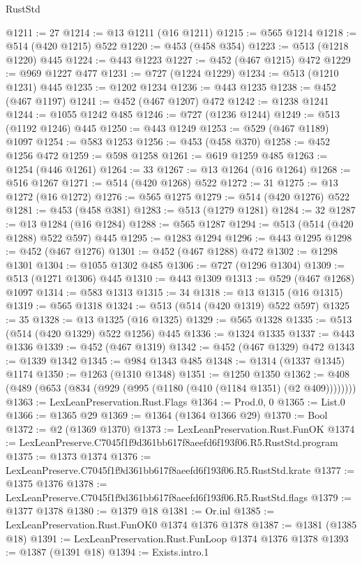 \begin{lexlean}{RustStd}
\begin{coremodule}
@1211 := 27
@1214 := @13 @1211 (@16 @1211)
@1215 := @565 @1214
@1218 := @514 (@420 @1215) @522
@1220 := @453 (@458 @354)
@1223 := @513 (@1218 @1220) @445
@1224 := @443 @1223
@1227 := @452 (@467 @1215) @472
@1229 := @969 @1227 @477
@1231 := @727 (@1224 @1229)
@1234 := @513 (@1210 @1231) @445
@1235 := @1202 @1234
@1236 := @443 @1235
@1238 := @452 (@467 @1197)
@1241 := @452 (@467 @1207) @472
@1242 := @1238 @1241
@1244 := @1055 @1242 @485
@1246 := @727 (@1236 @1244)
@1249 := @513 (@1192 @1246) @445
@1250 := @443 @1249
@1253 := @529 (@467 @1189) @1097
@1254 := @583 @1253
@1256 := @453 (@458 @370)
@1258 := @452 @1256 @472
@1259 := @598 @1258
@1261 := @619 @1259 @485
@1263 := @1254 (@446 @1261)
@1264 := 33
@1267 := @13 @1264 (@16 @1264)
@1268 := @516 @1267
@1271 := @514 (@420 @1268) @522
@1272 := 31
@1275 := @13 @1272 (@16 @1272)
@1276 := @565 @1275
@1279 := @514 (@420 @1276) @522
@1281 := @453 (@458 @381)
@1283 := @513 (@1279 @1281)
@1284 := 32
@1287 := @13 @1284 (@16 @1284)
@1288 := @565 @1287
@1294 := @513 (@514 (@420 @1288) @522 @597) @445
@1295 := @1283 @1294
@1296 := @443 @1295
@1298 := @452 (@467 @1276)
@1301 := @452 (@467 @1288) @472
@1302 := @1298 @1301
@1304 := @1055 @1302 @485
@1306 := @727 (@1296 @1304)
@1309 := @513 (@1271 @1306) @445
@1310 := @443 @1309
@1313 := @529 (@467 @1268) @1097
@1314 := @583 @1313
@1315 := 34
@1318 := @13 @1315 (@16 @1315)
@1319 := @565 @1318
@1324 := @513 (@514 (@420 @1319) @522 @597)
@1325 := 35
@1328 := @13 @1325 (@16 @1325)
@1329 := @565 @1328
@1335 := @513 (@514 (@420 @1329) @522 @1256) @445
@1336 := @1324 @1335
@1337 := @443 @1336
@1339 := @452 (@467 @1319)
@1342 := @452 (@467 @1329) @472
@1343 := @1339 @1342
@1345 := @984 @1343 @485
@1348 := @1314 (@1337 @1345) @1174
@1350 := @1263 (@1310 @1348)
@1351 := @1250 @1350
@1362 := @408 (@489 (@653 (@834 (@929 (@995 (@1180 (@410 (@1184 @1351) (@2 @409))))))))
@1363 := LexLeanPreservation.Rust.Flags
@1364 := Prod.{0, 0}
@1365 := List.{0}
@1366 := @1365 @29
@1369 := @1364 (@1364 @1366 @29)
@1370 := Bool
@1372 := @2 (@1369 @1370)
@1373 := LexLeanPreservation.Rust.FunOK
@1374 := LexLeanPreserve.C7045f1f9d361bb617f8aeefd6f193f06.R5.RustStd.program
@1375 := @1373 @1374
@1376 := LexLeanPreserve.C7045f1f9d361bb617f8aeefd6f193f06.R5.RustStd.krate
@1377 := @1375 @1376
@1378 := LexLeanPreserve.C7045f1f9d361bb617f8aeefd6f193f06.R5.RustStd.flags
@1379 := @1377 @1378
@1380 := @1379 @18
@1381 := Or.inl
@1385 := LexLeanPreservation.Rust.FunOK0 @1374 @1376 @1378
@1387 := @1381 (@1385 @18)
@1391 := LexLeanPreservation.Rust.FunLoop @1374 @1376 @1378
@1393 := @1387 (@1391 @18)
@1394 := Exists.intro.{1}

\end{coremodule}
\end{lexlean}
